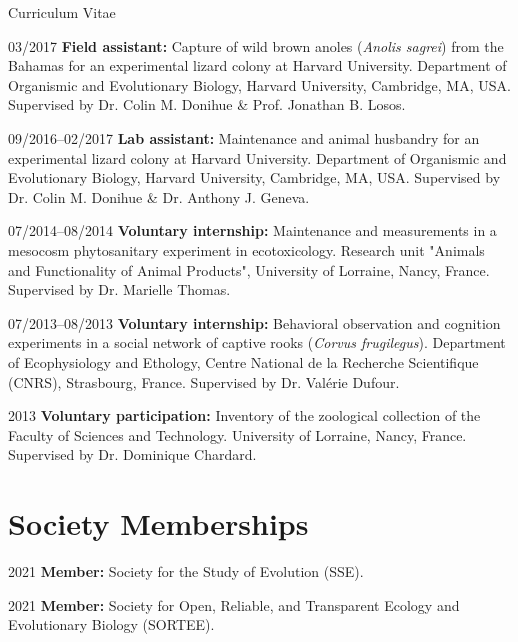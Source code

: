 \documentclass[11pt,a4paper]{article}
\begin{document}
\begin{cv}{Curriculum Vitae}
		\begin{cvlist}{}
		
			\item[03/2017] \textbf{Field assistant:} Capture of wild brown anoles (\textit{Anolis sagrei}) from the Bahamas for an experimental lizard colony at Harvard University. Department of Organismic and Evolutionary Biology, Harvard University, Cambridge, MA, USA. Supervised by Dr. Colin M. Donihue \& Prof. Jonathan B. Losos.
		
			\item[09/2016--02/2017] \textbf{Lab assistant:} Maintenance and animal husbandry for an experimental lizard colony at Harvard University. Department of Organismic and Evolutionary Biology, Harvard University, Cambridge, MA, USA. Supervised by Dr. Colin M. Donihue \& Dr. Anthony J. Geneva.
		
			\item[07/2014--08/2014] \textbf{Voluntary internship:} Maintenance and measurements in a mesocosm phytosanitary experiment in ecotoxicology. Research unit "Animals and Functionality of Animal Products", University of Lorraine, Nancy, France. Supervised by Dr. Marielle Thomas.
		
			\item[07/2013--08/2013] \textbf{Voluntary internship:} Behavioral observation and cognition experiments in a social network of captive rooks (\textit{Corvus frugilegus}). Department of Ecophysiology and Ethology, Centre National de la Recherche Scientifique (CNRS), Strasbourg, France. Supervised by Dr. Valérie Dufour.
		
			\item[2013] \textbf{Voluntary participation:} Inventory of the zoological collection of the Faculty of Sciences and Technology. University of Lorraine, Nancy, France. Supervised by Dr. Dominique Chardard.
		
		\end{cvlist}
		
		\section{Society Memberships}
		
		\begin{cvlist}{}
			
			\item[2021] \textbf{Member:} Society for the Study of Evolution (SSE). 
			
			\item[2021] \textbf{Member:} Society for Open, Reliable, and Transparent Ecology and Evolutionary Biology (SORTEE).
			

\end{cvlist}
\end{cv}
\end{document}
